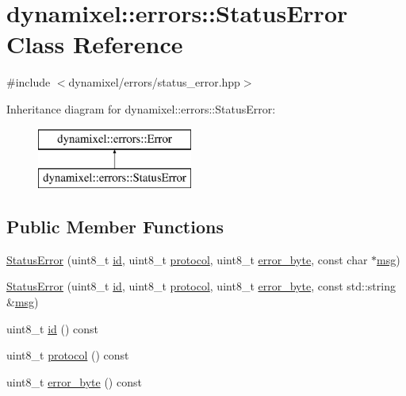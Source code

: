 \hypertarget{classdynamixel_1_1errors_1_1_status_error}{}\section{dynamixel\+:\+:errors\+:\+:Status\+Error Class Reference}
\label{classdynamixel_1_1errors_1_1_status_error}


{\ttfamily \#include $<$dynamixel/errors/status\+\_\+error.\+hpp$>$}

Inheritance diagram for dynamixel\+:\+:errors\+:\+:Status\+Error\+:\begin{figure}[H]
\begin{center}
\leavevmode
\includegraphics[height=2.000000cm]{classdynamixel_1_1errors_1_1_status_error}
\end{center}
\end{figure}
\subsection*{Public Member Functions}
\begin{DoxyCompactItemize}
\item 
\hyperlink{classdynamixel_1_1errors_1_1_status_error_aa65b6cfb661ee568e3d0de5f2dc39636}{Status\+Error} (uint8\+\_\+t \hyperlink{classdynamixel_1_1errors_1_1_status_error_ad3906f0bf46d880e9724502fc511118f}{id}, uint8\+\_\+t \hyperlink{classdynamixel_1_1errors_1_1_status_error_a14fedbd79a5ff732a420c268f1580761}{protocol}, uint8\+\_\+t \hyperlink{classdynamixel_1_1errors_1_1_status_error_a13f34f9b438f50df8e4a762e4211f7c0}{error\+\_\+byte}, const char $\ast$\hyperlink{classdynamixel_1_1errors_1_1_error_a4c0804f137545e62204c49fca4c30dcb}{msg})
\item 
\hyperlink{classdynamixel_1_1errors_1_1_status_error_ab1e22738b41152348644db7128c01413}{Status\+Error} (uint8\+\_\+t \hyperlink{classdynamixel_1_1errors_1_1_status_error_ad3906f0bf46d880e9724502fc511118f}{id}, uint8\+\_\+t \hyperlink{classdynamixel_1_1errors_1_1_status_error_a14fedbd79a5ff732a420c268f1580761}{protocol}, uint8\+\_\+t \hyperlink{classdynamixel_1_1errors_1_1_status_error_a13f34f9b438f50df8e4a762e4211f7c0}{error\+\_\+byte}, const std\+::string \&\hyperlink{classdynamixel_1_1errors_1_1_error_a4c0804f137545e62204c49fca4c30dcb}{msg})
\item 
uint8\+\_\+t \hyperlink{classdynamixel_1_1errors_1_1_status_error_ad3906f0bf46d880e9724502fc511118f}{id} () const 
\item 
uint8\+\_\+t \hyperlink{classdynamixel_1_1errors_1_1_status_error_a14fedbd79a5ff732a420c268f1580761}{protocol} () const 
\item 
uint8\+\_\+t \hyperlink{classdynamixel_1_1errors_1_1_status_error_a13f34f9b438f50df8e4a762e4211f7c0}{error\+\_\+byte} () const 
\end{DoxyCompactItemize}


